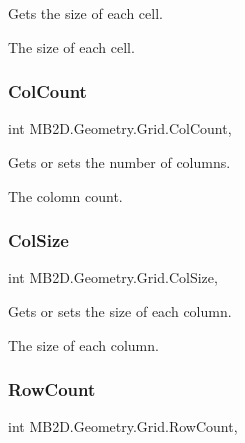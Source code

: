 Gets the size of each cell. 

The size of each cell.\hypertarget{class_m_b2_d_1_1_geometry_1_1_grid_a515c09f56ad55f3742b6a0eccdb15856}{}\label{class_m_b2_d_1_1_geometry_1_1_grid_a515c09f56ad55f3742b6a0eccdb15856} 
\subsubsection{\texorpdfstring{Col\+Count}{ColCount}}
{\footnotesize\ttfamily int M\+B2\+D.\+Geometry.\+Grid.\+Col\+Count\hspace{0.3cm}{\ttfamily [get]}, {\ttfamily [set]}}



Gets or sets the number of columns. 

The colomn count.\hypertarget{class_m_b2_d_1_1_geometry_1_1_grid_aef6e8277c73fcb160fa551836f3685da}{}\label{class_m_b2_d_1_1_geometry_1_1_grid_aef6e8277c73fcb160fa551836f3685da} 
\subsubsection{\texorpdfstring{Col\+Size}{ColSize}}
{\footnotesize\ttfamily int M\+B2\+D.\+Geometry.\+Grid.\+Col\+Size\hspace{0.3cm}{\ttfamily [get]}, {\ttfamily [set]}}



Gets or sets the size of each column. 

The size of each column.\hypertarget{class_m_b2_d_1_1_geometry_1_1_grid_ad2599c5d630bb783ff2ba062c276be9a}{}\label{class_m_b2_d_1_1_geometry_1_1_grid_ad2599c5d630bb783ff2ba062c276be9a} 
\subsubsection{\texorpdfstring{Row\+Count}{RowCount}}
{\footnotesize\ttfamily int M\+B2\+D.\+Geometry.\+Grid.\+Row\+Count\hspace{0.3cm}{\ttfamily [get]}, {\ttfamily [set]}}



